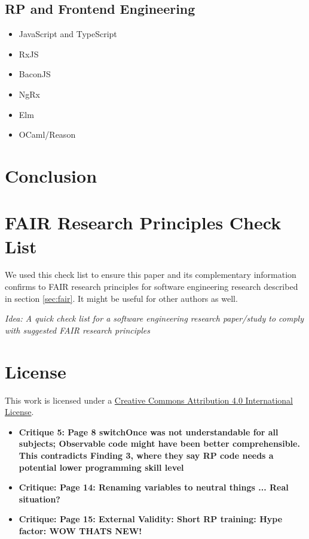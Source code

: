 \documentclass[12pt,a4paper]{article}
\begin{document}
\subsection{RP and Frontend Engineering}


\begin{itemize}
	\item JavaScript and TypeScript
	\item RxJS
	\item BaconJS
	\item NgRx
	\item Elm
	\item OCaml/Reason
\end{itemize}


\section{Conclusion}


\appendix
\section{FAIR Research Principles Check List}

We used this check list to ensure this paper and its complementary information confirms to FAIR research principles for software engineering research described in section \ref{sec:fair}. It might be useful for other authors as well.

\emph{Idea: A quick check list for a software engineering research paper/study to comply with suggested FAIR research principles}




\section*{License}
\ccby\thinspace\thinspace This work is licensed under a \href{https://creativecommons.org/licenses/by/4.0/}{Creative Commons Attribution 4.0 International License}.

\begin{itemize}
	\item \textbf{Critique 5: Page 8 switchOnce was not understandable for all subjects; Observable code might have been better comprehensible. This contradicts Finding 3, where they say RP code needs a potential lower programming skill level}
	\item \textbf{Critique: Page 14: Renaming variables to neutral things ... Real situation?}
	\item \textbf{Critique: Page 15: External Validity: Short RP training: Hype factor: WOW THATS NEW!}
\end{itemize}
\end{document}
